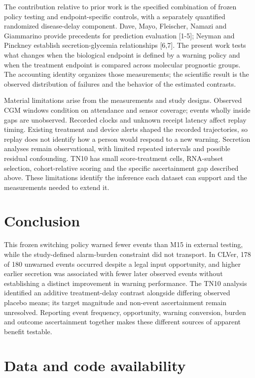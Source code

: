 \documentclass[
  american,
  11pt,
  letterpaper,
]{article}
\begin{document}
The contribution relative to prior work is the specified combination of
frozen policy testing and endpoint-specific controls, with a separately
quantified randomized disease-delay component. Dave, Mayo, Fleischer,
Namazi and Giammarino provide precedents for prediction evaluation
{[}1-5{]}; Neyman and Pinckney establish secretion-glycemia
relationships {[}6,7{]}. The present work tests what changes when the
biological endpoint is defined by a warning policy and when the
treatment endpoint is compared across molecular prognostic groups. The
accounting identity organizes those measurements; the scientific result
is the observed distribution of failures and the behavior of the
estimated contrasts.

Material limitations arise from the measurements and study designs.
Observed CGM windows condition on attendance and sensor coverage; events
wholly inside gaps are unobserved. Recorded clocks and unknown receipt
latency affect replay timing. Existing treatment and device alerts
shaped the recorded trajectories, so replay does not identify how a
person would respond to a new warning. Secretion analyses remain
observational, with limited repeated intervals and possible residual
confounding. TN10 has small score-treatment cells, RNA-subset selection,
cohort-relative scoring and the specific ascertainment gap described
above. These limitations identify the inference each dataset can support
and the measurements needed to extend it.

\section{Conclusion}\label{conclusion}

This frozen switching policy warned fewer events than M15 in external
testing, while the study-defined alarm-burden constraint did not
transport. In CLVer, 178 of 180 unwarned events occurred despite a legal
input opportunity, and higher earlier secretion was associated with
fewer later observed events without establishing a distinct improvement
in warning performance. The TN10 analysis identified an additive
treatment-delay contrast alongside differing observed placebo means; its
target magnitude and non-event ascertainment remain unresolved.
Reporting event frequency, opportunity, warning conversion, burden and
outcome ascertainment together makes these different sources of apparent
benefit testable.

\section{Data and code availability}\label{data-and-code-availability}
\end{document}
